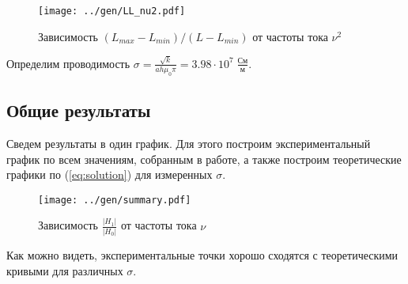 \begin{figure}[H]
	\centering
	\texttt{[image: ../gen/LL\_nu2.pdf]}
	\caption{Зависимость $(L_{max} - L_{min})/(L - L_{min})$ от частоты тока $\nu^2$}
	\label{fig:LL_nu^2}
\end{figure}

Определим проводимость $\sigma = \frac{\sqrt{k}}{a h \mu_0 \pi} = 3.98 \cdot 10^7 \; \frac{\text{См}}{\text{м}}$.

\subsection*{Общие результаты}

Сведем результаты в один график. Для этого построим экспериментальный график по всем значениям, собранным в работе, а также построим теоретические графики по (\ref{eq:solution}) для измеренных $\sigma$.

\begin{figure}[H]
	\centering
	\texttt{[image: ../gen/summary.pdf]}
	\caption{Зависимость $\frac{|H_1|}{|H_0|}$ от частоты тока $\nu$}
	\label{fig:summary}
\end{figure}

Как можно видеть, экспериментальные точки хорошо сходятся с теоретическими кривыми для различных $\sigma$.